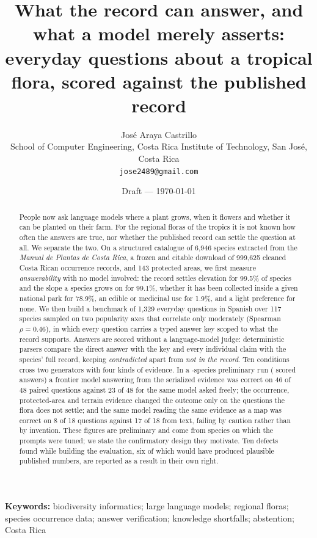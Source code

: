 \documentclass[11pt,a4paper]{article}
\title{\textbf{What the record can answer, and what a model merely asserts:\\
everyday questions about a tropical flora, scored against the published record}}
\author{José Araya Castrillo\\[2pt]
\small School of Computer Engineering, Costa Rica Institute of Technology, San José, Costa Rica\\
\small \texttt{jose2489@gmail.com}}
\date{Draft --- \today}
\begin{document}
\maketitle

\begin{abstract}
\noindent
People now ask language models where a plant grows, when it flowers and whether it
can be planted on their farm. For the regional floras of the tropics it is not known
how often the answers are true, nor whether the published record can settle the
question at all. We separate the two. On a structured catalogue of 6{,}946 species
extracted from the \emph{Manual de Plantas de Costa Rica}, a frozen and citable
download of 999{,}625 cleaned Costa Rican occurrence records, and 143 protected
areas, we first measure \emph{answerability} with no model involved: the record
settles elevation for 99.5\% of species and the slope a species grows on for 99.1\%,
whether it has been collected inside a given national park for 78.9\%, an edible or
medicinal use for 1.9\%, and a light preference for none. We then build a benchmark
of 1{,}329 everyday questions in Spanish over 117 species sampled on two popularity
axes that correlate only moderately (Spearman $\rho = 0.46$), in which every question
carries a typed answer key scoped to what the record supports. Answers are scored
without a language-model judge: deterministic parsers compare the direct answer with
the key and every individual claim with the species' full record, keeping
\emph{contradicted} apart from \emph{not in the record}. Ten conditions cross two
generators with four kinds of evidence. In a \RunSpecies-species preliminary run
(\RunAnswers{} scored answers) a frontier model answering from the serialized
evidence was correct on 46 of 48 paired questions against 23 of 48 for the same
model asked freely; the occurrence, protected-area and terrain evidence changed the
outcome only on the questions the flora does not settle; and the same model reading
the same evidence as a map was correct on 8 of 18 questions against 17 of 18 from
text, failing by caution rather than by invention. These figures are preliminary and
come from species on which the prompts were tuned; we state the confirmatory design
they motivate. Ten defects found while building the evaluation, six of which would
have produced plausible published numbers, are reported as a result in their own
right.
\end{abstract}

\noindent\textbf{Keywords:} biodiversity informatics; large language models; regional
floras; species occurrence data; answer verification; knowledge shortfalls;
abstention; Costa Rica
\end{document}
